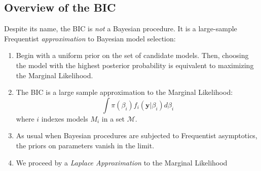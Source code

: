 \subsection{Overview of the BIC}
Despite its name, the BIC is \emph{not} a Bayesian procedure.
It is a large-sample Frequentist \emph{approximation} to Bayesian model selection:
	\begin{enumerate}
		\item Begin with a uniform prior on the set of candidate models.
      Then, choosing the model with the highest posterior probability is equivalent to maximizing the Marginal Likelihood.
		\item The BIC is a large sample approximation to the Marginal Likelihood:
		$$\int \pi(\beta_i)f_i(\mathbf{y}|\beta_i)d\beta_i$$
		where $i$ indexes models $M_i$ in a set $\mathcal{M}$.
		\item As usual when Bayesian procedures are subjected to Frequentist asymptotics, the priors on parameters vanish in the limit.
		\item We proceed by a \emph{Laplace Approximation} to the Marginal Likelihood
	\end{enumerate}


